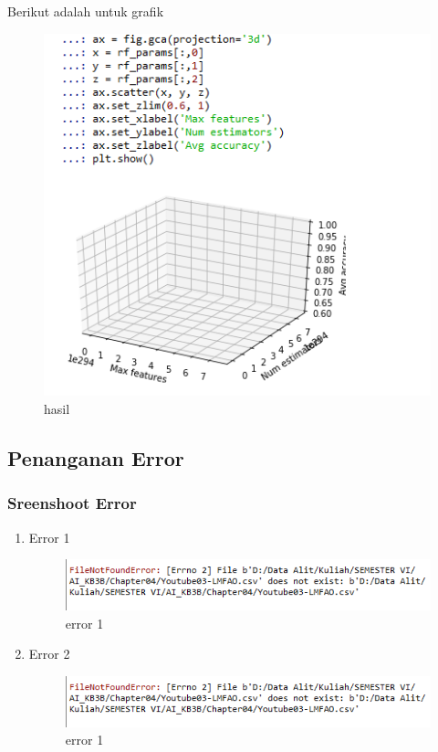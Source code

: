 \begin{enumerate}
\par Berikut adalah untuk grafik

\begin{figure}[H]
\centering
\includegraphics[scale=0.7]{figures/1174057/chapter4/14.PNG}
\caption{hasil}
\label{Praktek no 8 Grafik}
\end{figure}
\end{enumerate}

\subsection{Penanganan Error}
\subsubsection{Sreenshoot Error}
\begin{enumerate}
\item Error 1
\begin{figure}[H]
\centering
\includegraphics[scale=1]{figures/1174057/chapter4/error1.PNG}
\caption{error 1}
\label{error 1}
\end{figure}        

\item Error 2
\begin{figure}[H]
\centering
\includegraphics[scale=1]{figures/1174057/chapter4/error1.PNG}
\caption{error 1}
\label{error 1}
\end{figure}       
\end{enumerate} 

